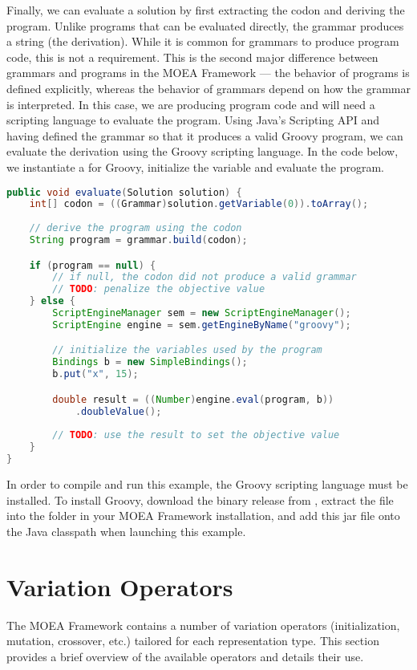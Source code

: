 Finally, we can evaluate a solution by first extracting the codon and deriving the program.  Unlike programs that can be evaluated directly, the grammar produces a string (the derivation).  While it is common for grammars to produce program code, this is not a requirement.  This is the second major difference between grammars and programs in the MOEA Framework --- the behavior of programs is defined explicitly, whereas the behavior of grammars depend on how the grammar is interpreted.  In this case, we are producing program code and will need a scripting language to evaluate the program.  Using Java's Scripting API and having defined the grammar so that it produces a valid Groovy program, we can evaluate the derivation using the Groovy scripting language.  In the code below, we instantiate a  for Groovy, initialize the variable  and evaluate the program.
\begin{lstlisting}[language=Java]
public void evaluate(Solution solution) {
    int[] codon = ((Grammar)solution.getVariable(0)).toArray();
    
    // derive the program using the codon
    String program = grammar.build(codon);

    if (program == null) {
        // if null, the codon did not produce a valid grammar
        // TODO: penalize the objective value
    } else {
        ScriptEngineManager sem = new ScriptEngineManager();
        ScriptEngine engine = sem.getEngineByName("groovy");

        // initialize the variables used by the program
        Bindings b = new SimpleBindings();
        b.put("x", 15);

        double result = ((Number)engine.eval(program, b))
            .doubleValue();
            
        // TODO: use the result to set the objective value
    }
}
\end{lstlisting}

In order to compile and run this example, the Groovy scripting language must be installed.  To install Groovy, download the binary release from , extract the  file into the  folder in your MOEA Framework installation, and add this jar file onto the Java classpath when launching this example.

\section{Variation Operators}
The MOEA Framework contains a number of variation operators (initialization, mutation, crossover, etc.) tailored for each representation type.  This section provides a brief overview of the available operators and details their use.

